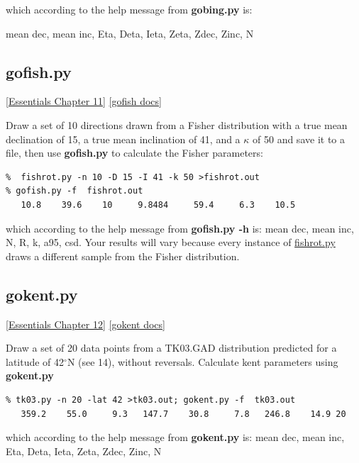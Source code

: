 \documentclass[11pt]{book}
\begin{document}
{{\noindent  which according to the help message from {\bf gobing.py} is:

mean dec, mean inc, Eta, Deta, Ieta, Zeta, Zdec, Zinc, N


\subsection{gofish.py}
 \href{http://earthref.org/MAGIC/books/Tauxe/Essentials/WebBook3ch11.html#ch11}{[Essentials Chapter 11]}
 \href{https://github.com/PmagPy/PmagPy/blob/master/programs/gofish.py}{[gofish docs]}

 Draw a set of 10 directions drawn  from a Fisher distribution with a true mean declination of 15, a true mean inclination of 41, and a $\kappa$ of  50 and save it to a file, then use {\bf gofish.py} to calculate the Fisher parameters:

\begin{verbatim}
%  fishrot.py -n 10 -D 15 -I 41 -k 50 >fishrot.out
% gofish.py -f  fishrot.out
   10.8    39.6    10     9.8484     59.4     6.3    10.5
\end{verbatim}

\noindent     which according to the help message from {\bf gofish.py -h} is:   mean dec, mean inc, N, R, k, a95, csd.  Your results will vary because every instance of \href{#fishrot.py}{fishrot.py} draws a different sample from the Fisher distribution.

%

\subsection{gokent.py}
 \href{http://earthref.org/MAGIC/books/Tauxe/Essentials/WebBook3ch11.html#ch11}{[Essentials Chapter 12]}
 \href{https://github.com/PmagPy/PmagPy/blob/master/programs/gokent.py}{[gokent docs]}

Draw a set of 20 data points  from a TK03.GAD distribution predicted for a latitude of 42$^{\circ}$N (see  14), without  reversals.  Calculate kent parameters using {\bf gokent.py}

\begin{verbatim}
% tk03.py -n 20 -lat 42 >tk03.out; gokent.py -f  tk03.out
   359.2    55.0     9.3   147.7    30.8     7.8   246.8    14.9 20
\end{verbatim}

\noindent  which according to the help message from {\bf gokent.py} is:   mean dec, mean inc, Eta, Deta, Ieta, Zeta, Zdec, Zinc, N

}}
\end{document}
